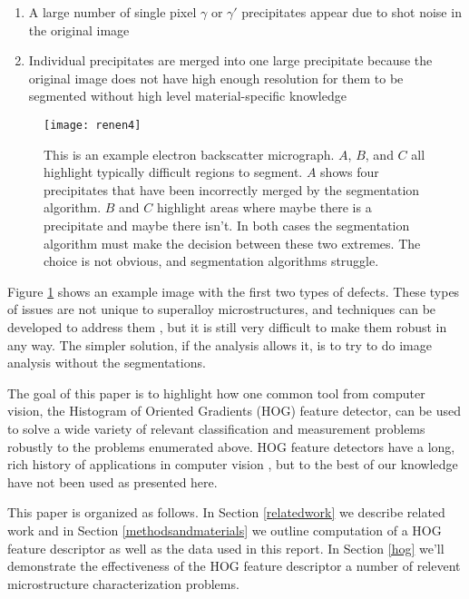 \documentclass[review]{elsarticle}
\begin{document}
	\begin{enumerate}
		\item \label{prob1} A large number of single pixel $\gamma$ or $\gamma'$ precipitates appear due to shot noise in the original image
		\item Individual precipitates are merged into one large precipitate because the original image does not have high enough resolution for them to be segmented without high level material-specific knowledge
	\end{enumerate}
	
	\begin{figure}[!ht]
  		\centering
    	\texttt{[image: renen4]}
  		\caption{This is an example electron backscatter micrograph. $A$, $B$, and $C$ all highlight typically difficult regions to segment. $A$ shows four precipitates that have been incorrectly merged by the segmentation algorithm. $B$ and $C$ highlight areas where maybe there is a precipitate and maybe there isn't. In both cases the segmentation algorithm must make the decision between these two extremes. The choice is not obvious, and segmentation algorithms struggle. }
  		\label{figure1}
	\end{figure}

	Figure \ref{figure1} shows an example image with the first two types of defects. These types of issues are not unique to superalloy microstructures, and techniques can be developed to address them \cite{comer, marc1, marc2, marc3}, but it is still very difficult to make them robust in any way. The simpler solution, if the analysis allows it, is to try to do image analysis without the segmentations.
	

	The goal of this paper is to highlight how one common tool from computer vision, the Histogram of Oriented Gradients (HOG) feature detector, can be used to solve a wide variety of relevant classification and measurement problems robustly to the problems enumerated above. HOG feature detectors have a long, rich history of applications in computer vision \cite{gradtex, hog, girsh}, but to the best of our knowledge have not been used as presented here.

	This paper is organized as follows. In Section \ref{relatedwork} we describe related work and in Section \ref{methodsandmaterials} we outline computation of a HOG feature descriptor as well as the data used in this report. In Section \ref{hog} we'll demonstrate the effectiveness of the HOG feature descriptor a number of relevent microstructure characterization problems.
	
\end{document}
